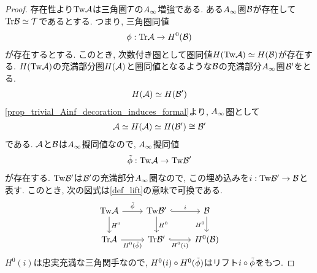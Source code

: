 \documentclass[uplatex, a4paper, 14Q, dvipdfmx]{jsarticle}
\begin{document}
\begin{proof}
  存在性より$\mathrm{Tw}\mathcal{A}$は三角圏$\mathcal{T}$の$A_{\infty}$増強である.
  ある$A_{\infty}$圏$\mathcal{B}$が存在して$\mathrm{Tr}\mathcal{B} \simeq \mathcal{T}$であるとする. 
  つまり, 三角圏同値
  \begin{align*}
    \phi : \mathrm{Tr}\mathcal{A} \to H^0(\mathcal{B})
  \end{align*}
  が存在するとする. 
  このとき, 次数付き圏として圏同値$H(\mathrm{Tw}\mathcal{A}) \simeq H(\mathcal{B})$が存在する. 
  $H(\mathrm{Tw}\mathcal{A})$の充満部分圏$H(\mathcal{A})$と圏同値となるような$\mathcal{B}$の充満部分$A_{\infty}$圏$\mathcal{B}'$をとる.
  \begin{align*}
    H(\mathcal{A}) \simeq H(\mathcal{B}')
  \end{align*}
  \cref{prop_trivial_Ainf_decoration_induces_formal}より, $A_{\infty}$圏として
  \begin{align*}
    \mathcal{A} \simeq H(\mathcal{A}) \simeq H(\mathcal{B}') \cong \mathcal{B}'
  \end{align*}
  である. 
  $\mathcal{A}$と$\mathcal{B}$は$A_{\infty}$擬同値なので, $A_{\infty}$擬同値 
  \begin{align*}
    \tilde{\phi} : \mathrm{Tw}\mathcal{A} \to \mathrm{Tw}\mathcal{B}'
  \end{align*}
  が存在する. 
  $\mathrm{Tw}\mathcal{B}'$は$\mathcal{B}'$の充満部分$A_{\infty}$圏なので, この埋め込みを$i : \mathrm{Tw}\mathcal{B}' \to \mathcal{B}$と表す.
  このとき, 次の図式は\cref{def_lift}の意味で可換である.
  \[\begin{tikzcd}
    \Tw\A & {\Tw\B'} & \B \\
    \Tr\A & {\Tr\B'} & {H^0(\B)}
    \arrow["i", hook, from=1-2, to=1-3]
    \arrow["\tilphi", from=1-1, to=1-2]
    \arrow["{H^0}", from=1-1, to=2-1]
    \arrow["{H^0}", from=1-2, to=2-2]
    \arrow["{H^0}"', from=1-3, to=2-3]
    \arrow["{H^0(\tilphi)}"', from=2-1, to=2-2]
    \arrow["{H^0(i)}"', hook, from=2-2, to=2-3]
  \end{tikzcd}\]
  $H^0(i)$は忠実充満な三角関手なので, $H^0(i) \circ H^0(\tilde{\phi})$はリフト$i \circ \tilde{\phi}$をもつ. 
\end{proof}


  



\end{document}
